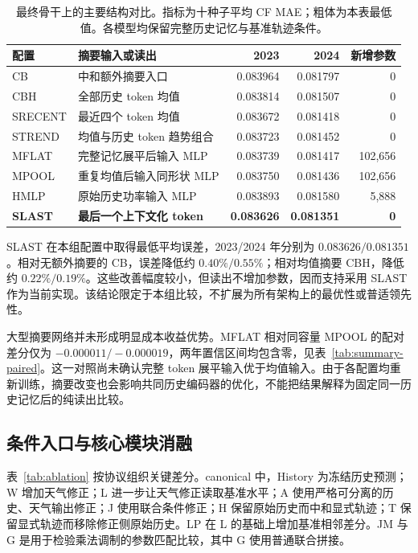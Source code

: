 \begin{table}[tbp]
 \centering
 \caption{最终骨干上的主要结构对比。指标为十种子平均 CF MAE；粗体为本表最低值。各模型均保留完整历史记忆与基准轨迹条件。}
 \label{tab:main-comparison}
 \small
 \setlength{\tabcolsep}{4pt}
 \begin{tabularx}{\linewidth}{lXrrr}
 \toprule
 配置 & 摘要输入或读出 & 2023 & 2024 & 新增参数 \\
 \midrule
 CB & 中和额外摘要入口 & 0.083964 & 0.081797 & 0 \\
 CBH & 全部历史 token 均值 & 0.083814 & 0.081507 & 0 \\
 SRECENT & 最近四个 token 均值 & 0.083672 & 0.081418 & 0 \\
 STREND & 均值与历史 token 趋势组合 & 0.083723 & 0.081452 & 0 \\
 MFLAT & 完整记忆展平后输入 MLP & 0.083739 & 0.081417 & 102,656 \\
 MPOOL & 重复均值后输入同形状 MLP & 0.083750 & 0.081436 & 102,656 \\
 HMLP & 原始历史功率输入 MLP & 0.083893 & 0.081580 & 5,888 \\
 \textbf{SLAST} & \textbf{最后一个上下文化 token} & \textbf{0.083626} & \textbf{0.081351} & \textbf{0} \\
 \bottomrule
 \end{tabularx}
\end{table}

SLAST 在本组配置中取得最低平均误差，2023/2024 年分别为 $0.083626/0.081351$。相对无额外摘要的 CB，误差降低约 $0.40\%/0.55\%$；相对均值摘要 CBH，降低约 $0.22\%/0.19\%$。这些改善幅度较小，但读出不增加参数，因而支持采用 SLAST 作为当前实现。该结论限定于本组比较，不扩展为所有架构上的最优性或普适领先性。

大型摘要网络并未形成明显成本收益优势。MFLAT 相对同容量 MPOOL 的配对差分仅为 $-0.000011/-0.000019$，两年置信区间均包含零，见表~\ref{tab:summary-paired}。这一对照尚未确认完整 token 展平输入优于均值输入。由于各配置均重新训练，摘要改变也会影响共同历史编码器的优化，不能把结果解释为固定同一历史记忆后的纯读出比较。

\subsection{条件入口与核心模块消融}

表~\ref{tab:ablation} 按协议组织关键差分。canonical 中，History 为冻结历史预测；W 增加天气修正；L 进一步让天气修正读取基准水平；A 使用严格可分离的历史、天气输出修正；J 使用联合条件修正；H 保留原始历史而中和显式轨迹；T 保留显式轨迹而移除修正侧原始历史。LP 在 L 的基础上增加基准相邻差分。JM 与 G 是用于检验乘法调制的参数匹配比较，其中 G 使用普通联合拼接。

